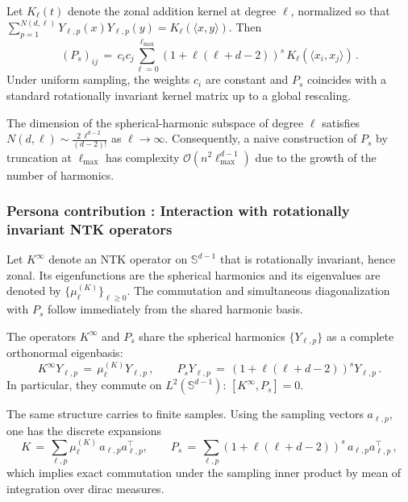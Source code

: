 \documentclass[a4paper]{article}
\begin{document}
\begin{remark}
Let $K_\ell(t)$ denote the zonal addition kernel at degree $\ell$, normalized so that $\sum_{p=1}^{N(d,\ell)} Y_{\ell,p}(x)Y_{\ell,p}(y) = K_\ell(\langle x,y\rangle)$. Then
\[
(P_s)_{ij} \,=\, c_i c_j \sum_{\ell=0}^{\ell_{\max}} (1+\ell(\ell+d-2))^{s} \, K_\ell(\langle x_i,x_j\rangle)\,.
\]
Under uniform sampling, the weights $c_i$ are constant and $P_s$ coincides with a standard rotationally invariant kernel matrix up to a global rescaling.
\end{remark}

The dimension of the spherical-harmonic subspace of degree $\ell$ satisfies $N(d,\ell) \sim \tfrac{2\, \ell^{d-2}}{(d-2)!}$ as $\ell \to \infty$. Consequently, a naive construction of $P_s$ by truncation at $\ell_{\max}$ has complexity $\mathcal{O}\!\left(n^2 \ell_{\max}^{d-1}\right)$ due to the growth of the number of harmonics.

\subsubsection{Persona contribution : Interaction with rotationally invariant NTK operators}

Let $K^{\infty}$ denote an NTK operator on $\mathbb{S}^{d-1}$ that is rotationally invariant, hence zonal. Its eigenfunctions are the spherical harmonics and its eigenvalues are denoted by $\{\mu_\ell^{(K)}\}_{\ell \ge 0}$. The commutation and simultaneous diagonalization with $P_s$ follow immediately from the shared harmonic basis.

\begin{theorem}
The operators $K^{\infty}$ and $P_s$ share the spherical harmonics $\{Y_{\ell,p}\}$ as a complete orthonormal eigenbasis:
\[
K^{\infty} Y_{\ell,p} \,=\, \mu_\ell^{(K)} Y_{\ell,p}\,, \qquad
P_s Y_{\ell,p} \,=\, (1+\ell(\ell+d-2))^{s} Y_{\ell,p}\,.
\]
In particular, they commute on $L^2(\mathbb{S}^{d-1})$: $[K^{\infty}, P_s]=0$.
\end{theorem}

The same structure carries to finite samples. Using the sampling vectors $a_{\ell,p}$, one has the discrete expansions
\[
K \,=\, \sum_{\ell,p} \mu_\ell^{(K)}\, a_{\ell,p} a_{\ell,p}^\top,\qquad
P_s \,=\, \sum_{\ell,p} (1+\ell(\ell+d-2))^{s}\, a_{\ell,p} a_{\ell,p}^\top\,,
\]
which implies exact commutation under the sampling inner product by mean of integration over dirac measures.
\end{document}
